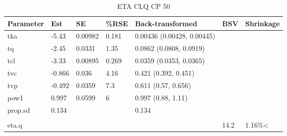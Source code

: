 \begin{table}
\centering\centering
\caption{ETA CLQ CP 50}
\centering
\fontsize{8}{10}\selectfont
\begin{tabular}[t]{lllllll}
\toprule
\textbf{Parameter} & \textbf{Est} & \textbf{SE} & \textbf{\%RSE} & \textbf{Back-transformed} & \textbf{BSV} & \textbf{Shrinkage}\\
\midrule
tka & -5.43 & 0.00982 & 0.181 & 0.00436 (0.00428, 0.00445) &  & \\
\midrule
tq & -2.45 & 0.0331 & 1.35 & 0.0862 (0.0808, 0.0919) &  & \\
\midrule
tcl & -3.33 & 0.00895 & 0.269 & 0.0359 (0.0353, 0.0365) &  & \\
\midrule
tvc & -0.866 & 0.036 & 4.16 & 0.421 (0.392, 0.451) &  & \\
\midrule
tvp & -0.492 & 0.0359 & 7.3 & 0.611 (0.57, 0.656) &  & \\
\midrule
pow1 & 0.997 & 0.0599 & 6 & 0.997 (0.88, 1.11) &  & \\
\midrule
prop.sd & 0.134 &  &  & 0.134 &  & \\
\midrule\\
eta.q &  &  &  &  & 14.2 & 1.16\%<\\
\bottomrule
\end{tabular}
\end{table}